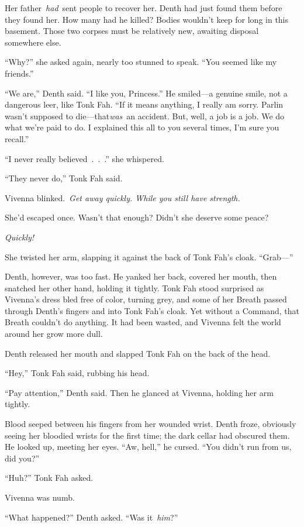 Her father~\textit{had}~sent people to recover her. Denth had just found them before they found her. How many had he killed? Bodies wouldn’t keep for long in this basement. Those two corpses must be relatively new, awaiting disposal somewhere else.

“Why?” she asked again, nearly too stunned to speak. “You seemed like my friends.”

“We are,” Denth said. “I like you, Princess.” He smiled—a genuine smile, not a dangerous leer, like Tonk Fah. “If it means anything, I really am sorry. Parlin wasn’t supposed to die—that\textit{was}~an accident. But, well, a job is a job. We do what we’re paid to do. I explained this all to you several times, I’m sure you recall.”

“I never really believed~.~.~.” she whispered.

“They never do,” Tonk Fah said.

Vivenna blinked.~\textit{Get away quickly. While you still have strength.}

She’d escaped once. Wasn’t that enough? Didn’t she deserve some peace?

\textit{Quickly!}

She twisted her arm, slapping it against the back of Tonk Fah’s cloak. “Grab—”

Denth, however, was too fast. He yanked her back, covered her mouth, then snatched her other hand, holding it tightly. Tonk Fah stood surprised as Vivenna’s dress bled free of color, turning grey, and some of her Breath passed through Denth’s fingers and into Tonk Fah’s cloak. Yet without a Command, that Breath couldn’t do anything. It had been wasted, and Vivenna felt the world around her grow more dull.

Denth released her mouth and slapped Tonk Fah on the back of the head.

“Hey,” Tonk Fah said, rubbing his head.

“Pay attention,” Denth said. Then he glanced at Vivenna, holding her arm tightly.

Blood seeped between his fingers from her wounded wrist. Denth froze, obviously seeing her bloodied wrists for the first time; the dark cellar had obscured them. He looked up, meeting her eyes. “Aw, hell,” he cursed. “You didn’t run from us, did you?”

“Huh?” Tonk Fah asked.

Vivenna was numb.

“What happened?” Denth asked. “Was it~\textit{him}?”

